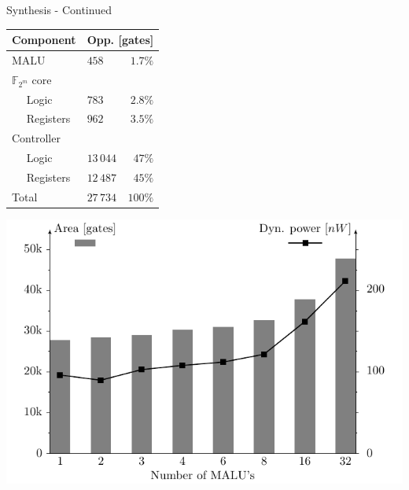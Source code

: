 \documentclass[svgnames, handout,t]{beamer}
\newenvironment{changemargin}[2]{%
\begin{list}{}{%
\setlength{\topsep}{0pt}%
\setlength{\leftmargin}{#1}%
\setlength{\rightmargin}{#2}%
\setlength{\listparindent}{\parindent}%
\setlength{\itemindent}{\parindent}%
\setlength{\parsep}{\parskip}%
}%
\item[]}{\end{list}}
\begin{document}
\begin{frame}{Synthesis - Continued}
\vfill
	\begin{center}
	\begin{changemargin}{-0.3cm}{-0.8cm}
		\begin{minipage}[c]{0.3\paperwidth}
			\tiny{\begin{tabular}{llr}
				\toprule
				Component					& \multicolumn{2}{c}{Opp. [gates]}\\
				\midrule
				MALU				 			& $458$		& $1.7\%$\\
				$\mathbb{F}_{2^m}$ core	&				& \\
				$\quad$ Logic				& $783$		& $2.8\%$\\
				$\quad$ Registers			& $962$		& $3.5\%$\\
				Controller					&				& \\
				$\quad$ Logic				& $13\,044$	& $47\%$\\
				$\quad$ Registers			& $12\,487$	& $45\%$\\
				\midrule
				Total						& $27\,734$	& $100\%$\\
				\bottomrule		
			\end{tabular}}
		\end{minipage}
		\hfill
		\begin{minipage}{0.60\paperwidth}
			\includegraphics[width=0.60\paperwidth]{images/results-md-en}
		\end{minipage}		
	\end{changemargin}
	\end{center}
\vfill
\end{frame}
\end{document}
